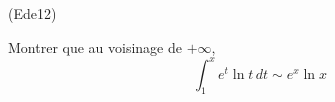 \begin{tiny}(Ede12)\end{tiny}
Montrer que au voisinage de $+\infty$,
\[\int_1^xe^t \ln t\,dt \sim e^x\ln x\]